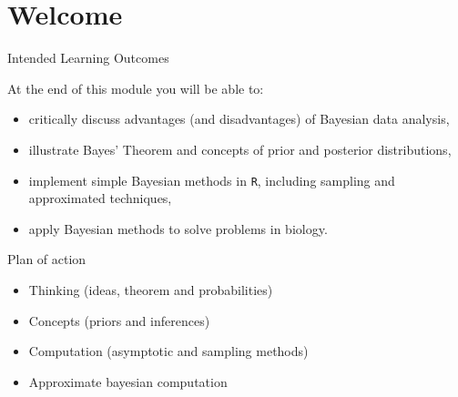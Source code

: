 
\section*{Welcome}

\begin{frame}{Intended Learning Outcomes}

	At the end of this module you will be able to:
	\begin{itemize}
		\item critically discuss advantages (and disadvantages) of Bayesian data analysis,
		\item illustrate Bayes' Theorem and concepts of prior and posterior distributions,
		\item implement simple Bayesian methods in \texttt{R}, including sampling and approximated techniques,
		\item apply Bayesian methods to solve problems in biology.
	\end{itemize}

\end{frame}

\begin{frame}{Plan of action}
	\begin{itemize}
		\item Thinking (ideas, theorem and probabilities)
		\item Concepts (priors and inferences)
		\item Computation (asymptotic and sampling methods)
		\item Approximate bayesian computation
	\end{itemize}
\end{frame}




